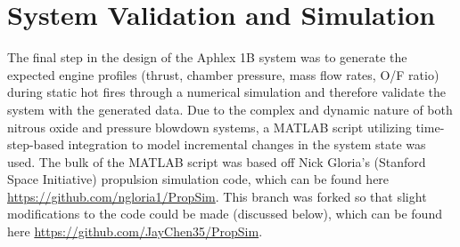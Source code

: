 \documentclass[9pt]{article} %
\numberwithin{equation}{section} %
\begin{document}
\section{System Validation and Simulation} \label{sec: system_validation}
\hspace{\parindent} The final step in the design of the Aphlex 1B system was to generate the expected engine profiles (thrust, chamber pressure, mass flow rates, O/F ratio) during static hot fires through a numerical simulation and therefore validate the system with the generated data. Due to the complex and dynamic nature of both nitrous oxide and pressure blowdown systems, a MATLAB script utilizing time-step-based integration to model incremental changes in the system state was used. The bulk of the MATLAB script was based off Nick Gloria's (Stanford Space Initiative) propulsion simulation code, which can be found here \url{https://github.com/ngloria1/PropSim}. This branch was forked so that slight modifications to the code could be made (discussed below), which can be found here \url{https://github.com/JayChen35/PropSim}.
\end{document}

